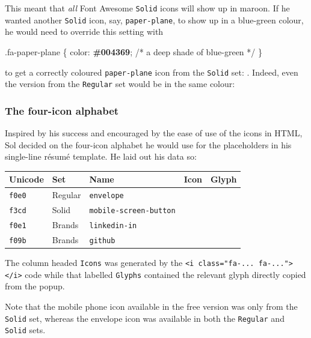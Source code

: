 \documentclass[
  british,
  a4paper,
  rgb,
  dvipsnames,
  svgnames,
  hyphens]{article}
\newenvironment{Shaded}{\begin{snugshade}}{\end{snugshade}}
\newcommand{\CommentTok}[1]{\textcolor[rgb]{0.50,0.62,0.50}{#1}}
\newcommand{\ConstantTok}[1]{\textcolor[rgb]{0.86,0.64,0.64}{\textbf{#1}}}
\newcommand{\FunctionTok}[1]{\textcolor[rgb]{0.94,0.94,0.56}{#1}}
\newcommand{\KeywordTok}[1]{\textcolor[rgb]{0.94,0.87,0.69}{#1}}
\newcommand{\NormalTok}[1]{\textcolor[rgb]{0.80,0.80,0.80}{#1}}
\newcommand{\OperatorTok}[1]{\textcolor[rgb]{0.94,0.94,0.82}{#1}}
\begin{document}
This meant that \emph{all} Font Awesome \texttt{Solid} icons will show
up in maroon. If he wanted another \texttt{Solid} icon, say,
\texttt{paper-plane}, to show up in a blue-green colour, he would need
to override this setting with

\begin{Shaded}
\begin{Highlighting}[]
\FunctionTok{.fa{-}paper{-}plane}\NormalTok{ \{}
    \KeywordTok{color}\NormalTok{: }\ConstantTok{\#004369}\OperatorTok{;} \CommentTok{/* a deep shade of blue{-}green */}
\NormalTok{\}}
\end{Highlighting}
\end{Shaded}

to get a correctly coloured \texttt{paper-plane} icon from the
\texttt{Solid} set: . Indeed, even the version from the \texttt{Regular}
set would be in the same colour:

\hypertarget{the-four-icon-alphabet}{%
\subsubsection{The four-icon alphabet}\label{the-four-icon-alphabet}}

Inspired by his success and encouraged by the ease of use of the icons
in HTML, Sol decided on the four-icon alphabet he would use for the
placeholders in his single-line résumé template. He laid out his data
so:

\begin{longtable}[]{@{}lllcc@{}}
\toprule
Unicode & Set & Name & Icon & Glyph \\
\midrule
\endhead
\texttt{f0e0} & Regular & \texttt{envelope} & &
\regulariconfont \normalfont \\
\texttt{f3cd} & Solid & \texttt{mobile-screen-button} & &
\solidiconfont \normalfont \\
\texttt{f0e1} & Brands & \texttt{linkedin-in} & & \brandsiconfont 
\normalfont \\
\texttt{f09b} & Brands & \texttt{github} & & \brandsiconfont 
\normalfont \\
\bottomrule
\end{longtable}

The column headed \texttt{Icons} was generated by the
\texttt{\textless{}i\ class="fa-...\ fa-..."\textgreater{}\textless{}/i\textgreater{}}
code while that labelled \texttt{Glyphs} contained the relevant glyph
directly copied from the popup.

Note that the mobile phone icon available in the free version was only
from the \texttt{Solid} set, whereas the envelope icon was available in
both the \texttt{Regular} and \texttt{Solid} sets.
\end{document}
